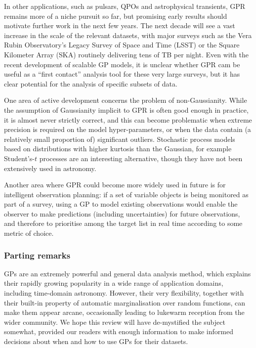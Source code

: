 \documentclass[letterpaper]{ar-1col}
\begin{document}
In other applications, such as pulsars, QPOs and astrophysical transients, GPR remains more of a niche pursuit so far, but promising early results should motivate further work in the next few years. The next decade will see a vast increase in the scale of the relevant datasets, with major surveys such as the Vera Rubin Observatory's Legacy Survey of Space and Time (LSST) or the Square Kilometer Array (SKA) routinely delivering tens of TB per night. Even with the recent development of scalable GP models, it is unclear whether GPR cam be useful as a ``first contact'' analysis tool for these very large surveys, but it has clear potential for the analysis of specific subsets of data.

One area of active development concerns the problem of non-Gaussianity. While the assumption of Gaussianity implicit to GPR is often good enough in practice, it is almost never strictly correct, and this can become problematic when extreme precision is required on the model hyper-parameters, or when the data contain (a relatively small proportion of) significant outliers. Stochastic process models based on distributions with higher kurtosis than the Gaussian, for example Student's-$t$ processes are an interesting alternative, though they have not been extensively used in astronomy.

Another area where GPR could become more widely used in future is for intelligent observation planning: if a set of variable objects is being monitored as part of a survey, using a GP to model existing observations would enable the observer to make predictions (including uncertainties) for future observations, and therefore to prioritise among the target list in real time according to some metric of choice. 

\subsubsection*{Parting remarks} GPs are an extremely powerful and general data analysis method, which explains their rapidly growing popularity in a wide range of application domains, including time-domain astronomy. However, their very flexibility, together with their built-in property of automatic marginalisation over random functions, can make them appear arcane, occasionally leading to lukewarm reception from the wider community. We hope this review will have de-mystified the subject somewhat, provided our readers with enough information to make informed decisions about when and how to use GPs for their datasets.
\end{document}
